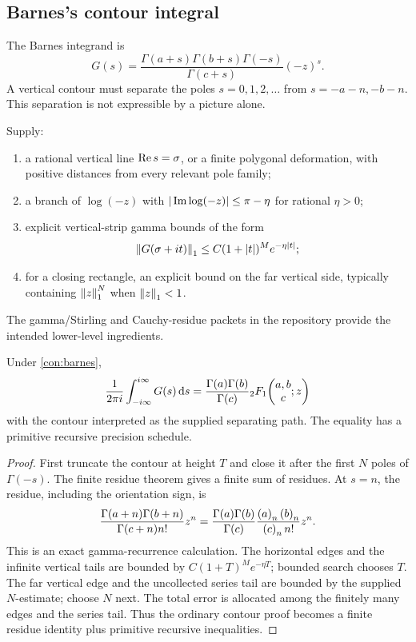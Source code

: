 \subsection{Barnes's contour integral}

The Barnes integrand is
\[
 G(s)=
 \frac{\Gamma(a+s)\Gamma(b+s)\Gamma(-s)}{\Gamma(c+s)}
 (-z)^s.
\]
A vertical contour must separate the poles
\(s=0,1,2,\ldots\) from
\(s=-a-n,-b-n\).  This separation is not expressible by a picture alone.

\begin{contract}\label{con:barnes}
Supply:
\begin{enumerate}
\item a rational vertical line \(\operatorname{Re} s=\sigma\), or a finite polygonal
deformation, with positive distances from every relevant pole family;
\item a branch of \(\log(-z)\) with
\(|\operatorname{Im}\log(-z)|\le\pi-\eta\) for rational \(\eta>0\);
\item explicit vertical-strip gamma bounds of the form
\[
 \left\lVert G(\sigma+it)\right\rVert_1\le C(1+|t|)^M e^{-\eta|t|};
\]
\item for a closing rectangle, an explicit bound on the far vertical side,
typically containing \(\left\lVert z\right\rVert_1^N\) when \(\left\lVert z\right\rVert_1<1\).
\end{enumerate}
The gamma/Stirling and Cauchy-residue packets in the repository provide the
intended lower-level ingredients.
\end{contract}

\begin{theorem}\label{thm:barnes}
Under \cref{con:barnes},
\begin{equation}\label{eq:barnes}
 \frac1{2\pi i}\int_{-i\infty}^{i\infty}G(s)\,\mathrm d s
 =\frac{\Gamma(a)\Gamma(b)}{\Gamma(c)}{}_2F_1\!\left(\begin{matrix}a,b\\c\end{matrix};z\right)
\end{equation}
with the contour interpreted as the supplied separating path.  The equality
has a primitive recursive precision schedule.
\end{theorem}

\begin{proof}
First truncate the contour at height \(T\) and close it after the first
\(N\) poles of \(\Gamma(-s)\).  The finite residue theorem gives a finite sum
of residues.  At \(s=n\), the residue, including the orientation sign, is
\[
 \frac{\Gamma(a+n)\Gamma(b+n)}{\Gamma(c+n)n!}z^n
 =\frac{\Gamma(a)\Gamma(b)}{\Gamma(c)}
   \frac{\left(a\right)_{n}\left(b\right)_{n}}{\left(c\right)_{n} n!}z^n.
\]
This is an exact gamma-recurrence calculation.  The horizontal edges and the
infinite vertical tails are bounded by
\(C(1+T)^Me^{-\eta T}\); bounded search chooses \(T\).  The far vertical edge
and the uncollected series tail are bounded by the supplied \(N\)-estimate;
choose \(N\) next.  The total error is allocated among the finitely many
edges and the series tail.  Thus the ordinary contour proof becomes a finite
residue identity plus primitive recursive inequalities.
\end{proof}

